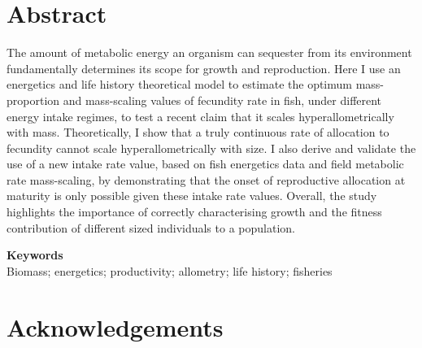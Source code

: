 \documentclass[a4paper]{article} %
\begin{document}
\section*{Abstract}\thispagestyle{plain}
    The amount of metabolic energy an organism can sequester from its environment fundamentally determines its scope for growth and reproduction. Here I use an energetics and life history theoretical model to estimate the optimum mass-proportion and mass-scaling values of fecundity rate in fish, under different energy intake regimes, to test a recent claim that it scales hyperallometrically with mass. Theoretically, I show that a truly continuous rate of allocation to fecundity cannot scale hyperallometrically with size. I also derive and validate the use of a new intake rate value, based on fish energetics data and field metabolic rate mass-scaling, by demonstrating that the onset of reproductive allocation at maturity is only possible given these intake rate values. Overall, the study highlights the importance of correctly characterising growth and the fitness contribution of different sized individuals to a population.

    \textbf{Keywords} \\
    Biomass; energetics; productivity; allometry; life history; fisheries
\section*{Acknowledgements}\thispagestyle{plain}
\end{document}
